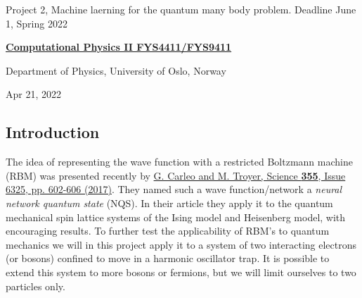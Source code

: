 \documentclass[%
oneside,                 %
final,                   %
10pt]{article}
\begin{document}

\newcommand{\exercisesection}[1]{\subsection*{#1}}






\thispagestyle{empty}

\begin{center}
{\LARGE\bf
\begin{spacing}{1.25}
Project 2, Machine laerning for  the quantum many body problem. Deadline June 1, Spring 2022
\end{spacing}
}
\end{center}


\begin{center}
{\bf \href{{http://www.uio.no/studier/emner/matnat/fys/FYS4411/index-eng.html}}{Computational Physics II FYS4411/FYS9411}}
\end{center}

    \begin{center}
\centerline{{\small Department of Physics, University of Oslo, Norway}}
\end{center}
    

\begin{center}
Apr 21, 2022
\end{center}

\vspace{1cm}


\subsection*{Introduction}

The idea of representing the wave function with
a restricted Boltzmann machine (RBM) was presented recently by \href{{http://science.sciencemag.org/content/355/6325/602}}{G. Carleo and M. Troyer, Science \textbf{355}, Issue 6325, pp. 602-606 (2017)}. They
named such a wave function/network a \textit{neural network quantum
state} (NQS). In their article they apply it to the quantum mechanical
spin lattice systems of the Ising model and Heisenberg model, with
encouraging results. To further test the applicability of RBM's to
quantum mechanics we will in this project apply it to a system of
two interacting electrons (or bosons)  confined to move in a harmonic oscillator trap.
It is possible to extend this system to more bosons or fermions, but we will limit ourselves to two particles only.
\end{document}
